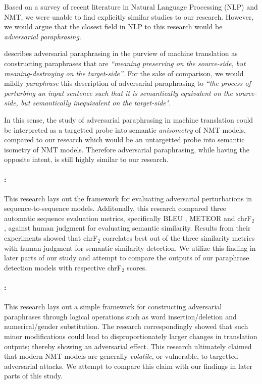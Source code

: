 \documentclass[11pt,a4paper]{article}
\begin{document}
Based on a survey of recent literature in Natural Language Processing (NLP) and NMT, we were unable to find explicitly similar studies to our research. However, we would argue that the closest field in NLP to this research would be \textit{adversarial paraphrasing}.

\citet{michel2019evaluation} describes adversarial paraphrasing in the purview of machine translation as constructing paraphrases that are \textit{``meaning preserving on the source-side, but meaning-destroying on the target-side''}. For the sake of comparison, we would mildly \textit{paraphrase} this description of adversarial paraphrasing to \textit{``the process of perturbing an input sentence such that it is semantically equivalent on the source-side, but semantically inequivalent on the target-side"}.

In this sense, the study of adversarial paraphrasing in machine translation could be interpreted as a targetted probe into semantic \textit{anisometry} of NMT models, compared to our research which would be an untargetted probe into semantic isometry of NMT models. Therefore adversarial paraphrasing, while having the opposite intent, is still highly similar to our research.

\paragraph{\citet{michel2019evaluation}:} This research lays out the framework for evaluating adversarial perturbations in sequence-to-sequence models. Additonally, this research compared three automatic sequence evaluation metrics, specifically BLEU \cite{papineni2002bleu}, METEOR \cite{denkowski2014meteor} and chrF$_2$ \cite{popovic2015chrf}, against human judgment for evaluating semantic similarity. Results from their experiments showed that chrF$_2$ correlates best out of the three similarity metrics with human judgment for semantic similarity detection. We utilize this finding in later parts of our study and attempt to compare the outputs of our paraphrase detection models with respective chrF$_2$ scores.

\paragraph{\citet{fadaee2020unreasonable}:} This research lays out a simple framework for constructing adversarial paraphrases through logical operations such as word insertion/deletion and numerical/gender substitution. The research correspondingly showed that such minor modifications could lead to disproportionately larger changes in translation outputs; thereby showing an adversarial effect. This research ultimately claimed that modern NMT models are generally \textit{volatile}, or vulnerable, to targetted adversarial attacks. We attempt to compare this claim with our findings in later parts of this study. 
\end{document}
